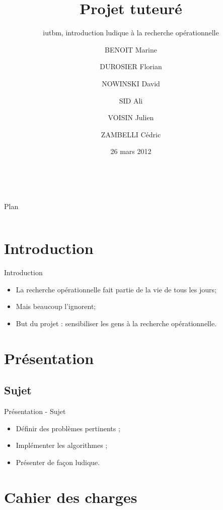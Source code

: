 \documentclass[xcolor=dvipsnames]{beamer}
\title[Projet tuteuré]{Projet tuteuré}
\subtitle[Projet Tuteuré]{iutbm, introduction ludique à la recherche opérationnelle}
\author[]{BENOIT Marine\and DUROSIER Florian\and NOWINSKI David\and SID Ali\and VOISIN Julien\and ZAMBELLI Cédric}
\institute[DUT Informatique -- IUT-BM]{DUT Informatique\par IUT de Belfort-Montbéliard}
\date{26 mars 2012}
\begin{document}
\begin{frame}{~}
	\titlepage
\end{frame}

%
%

\begin{frame}{Plan}
	\begin{columns}[t]
		\begin{column}{5cm}
			\tableofcontents[sections={1-5}, hideothersubsections]
		\end{column}
		\begin{column}{5cm}
			\tableofcontents[sections={6-9}, hideothersubsections]
		\end{column}
	\end{columns}
\end{frame}

\section{Introduction}
	\begin{frame}{Introduction}
		\begin{itemize}
			\setlength{\itemsep}{0.5cm}
			\item La recherche opérationnelle fait partie de la vie de tous les jours;
			\pause
			\item Mais beaucoup l'ignorent;
			\pause
			\item But du projet : sensibiliser les gens à la recherche
			    opérationnelle.
		\end{itemize}
	\end{frame}

\section{Présentation}
	\subsection{Sujet}
		\begin{frame}{Présentation - Sujet}
			\begin{itemize}
				\setlength{\itemsep}{1cm}
				\item Définir des problèmes pertinents ;
				\item Implémenter les algorithmes ;
				\item Présenter de façon ludique.
			\end{itemize}
		\end{frame}
\section{Cahier des charges}
\end{document}

